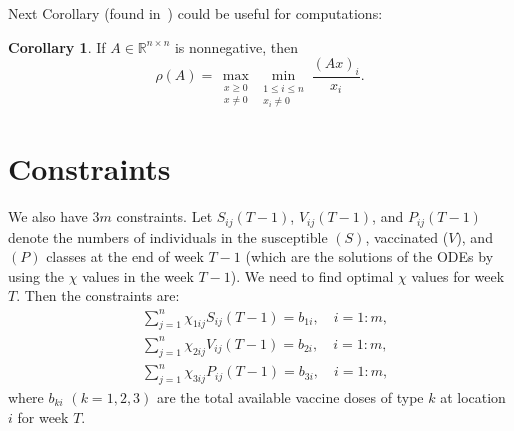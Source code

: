 \documentclass[12pt]{amsart}
\theoremstyle{definition}
\newtheorem{corollary}[theorem]{Corollary}
\begin{document}
Next Corollary (found in~\cite[Corollary~8.3.3]{1985Horn_Johnson}) could be useful for computations:

\begin{corollary}
If $A\in\mathds{R}^{n\times n}$ is nonnegative, then
\begin{equation}\label{max-min}
\rho(A) = \max_{\substack{x\ge 0 \\ x\neq 0}} 
\min_{\substack{1 \leq i  \leq n \\ x_i\neq 0}} \frac{(A x)_i}{x_i}.
\end{equation}
\end{corollary}
\section{Constraints}
We also have $3m$ constraints. Let $S_{ij}(T-1)$, $V_{ij}(T-1)$, and 
$P_{ij}(T-1)$ denote the numbers of individuals in the susceptible $(S)$, vaccinated ($V$), and $(P)$ classes {\color{red} at the end of week $T-1$} (which are the solutions of the ODEs by using the $\chi$ values in the week $T-1$). We need to find optimal $\chi$ values for week $T$. Then the constraints are:
\begin{equation}\label{eq:c}
\begin{aligned}
&\sum_{j=1}^n \chi_{1ij} S_{ij}(T-1) = b_{1i}, \quad i=1:m, \\
&\sum_{j=1}^n \chi_{2ij} V_{ij}(T-1) = b_{2i}, \quad i=1:m, \\
&\sum_{j=1}^n \chi_{3ij} P_{ij}(T-1) = b_{3i}, \quad i=1:m, 
\end{aligned}
\end{equation}
where $b_{ki}$ $(k=1, 2, 3)$ are the total available vaccine doses of type $k$ at location $i$ for week $T$. 

\end{document}
